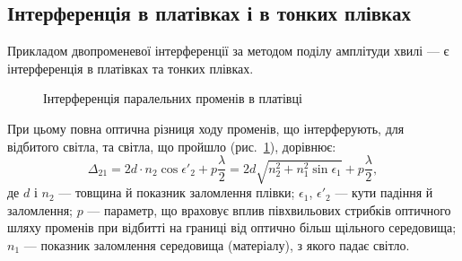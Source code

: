 \subsection*{Інтерференція в платівках і в тонких плівках}

%
%    
%
%

Прикладом двопроменевої інтерференції за методом поділу амплітуди хвилі ---
є інтерференція в платівках та тонких плівках.

\begin{figure}[h!]\centering
	\def\N{2} %
	
	\caption{Інтерференція паралельних променів в платівці}
	\label{pic:unterferece_in_film}
\end{figure}

При цьому повна оптична різниця ходу променів, що інтерферують, для
відбитого світла, та світла, що пройшло (рис.~\ref{pic:unterferece_in_film}), дорівнює:
\begin{equation}\label{eq:Delta_film}
	\Delta_{21} = 2d\cdot n_2\cos\epsilon'_2 + p\frac{\lambda}{2} = 2d\sqrt{n_2^2 + n_1^2\sin\epsilon_1} + p\frac{\lambda}{2},
\end{equation}
де $d$ і $n_2$ --- товщина й показник заломлення плівки; $\epsilon_1$, $\epsilon'_2$ --- кути падіння й заломлення; $p$ --- параметр, що враховує вплив півхвильових стрибків
оптичного шляху променів при відбитті на границі від оптично більш
щільного середовища; $n_1$ --- показник заломлення середовища (матеріалу), з
якого падає світло.

